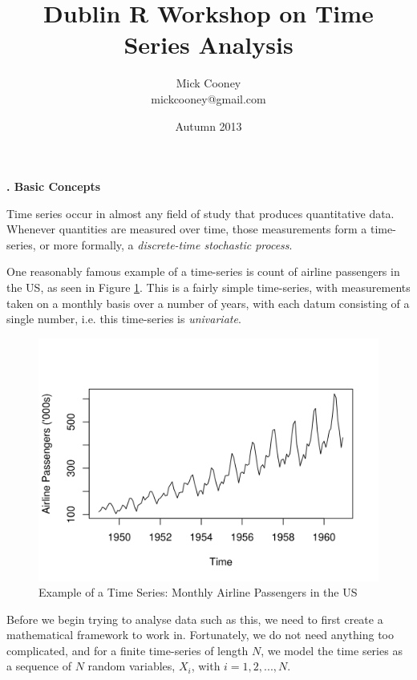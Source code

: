 \documentclass[10pt, a4paper]{article}
\title{Dublin R Workshop on Time Series Analysis}
\author{Mick Cooney\\mickcooney@gmail.com}
\date{Autumn 2013}
\newcounter{wssection}
\newcommand{\worksheetsection}[1]{
\vspace{10mm}
\stepcounter{wssection}
\noindent \Large \textbf{\thewssection. #1} \normalsize
\vspace{3mm}
}
\begin{document}
\maketitle


\worksheetsection{Basic Concepts}

\noindent
Time series occur in almost any field of study that produces
quantitative data. Whenever quantities are measured over time, those
measurements form a time-series, or more formally, a
\emph{discrete-time stochastic process}.

One reasonably famous example of a time-series is count of airline
passengers in the US, as seen in Figure \ref{fig1}. This is a fairly
simple time-series, with measurements taken on a monthly basis over a
number of years, with each datum consisting of a single number,
i.e. this time-series is \emph{univariate}.

\begin{figure}[h]
\begin{center}
\includegraphics{airline_passengers_plot.png}
\caption{\label{fig1}
Example of a Time Series: Monthly Airline Passengers in the US}
\end{center}
\end{figure}


Before we begin trying to analyse data such as this, we need to first
create a mathematical framework to work in. Fortunately, we do not
need anything too complicated, and for a finite time-series of length
$N$, we model the time series as a sequence of $N$ random variables,
$X_i$, with $i = 1, 2, ..., N$.
\end{document}
